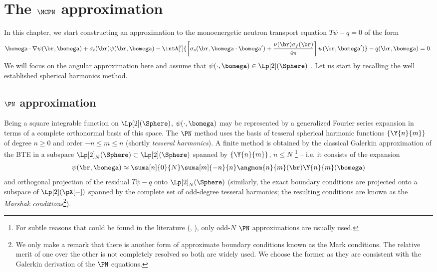 \chapter{The $\MCPN$ approximation}\label{sec:spn}

In this chapter, we start constructing an approximation to the monoenergetic neutron transport equation $T\psi - q = 0$
of the form
\begin{equation}\label{eq:MC-bte}
    \bomega\cdot\nabla\psi(\br,\bomega) + \sigma_t(\br)\psi(\br,\bomega) - \intA[']{\left[\sigma_s(\br,\bomega\cdot\bomega') + 
    \frac{\nu(\br)\sigma_f(\br)}{4\pi}\right]\psi(\br,\bomega')} - q(\br,\bomega) = 0.
\end{equation}
We will focus on the angular approximation here and assume that $\psi(\cdot,\bomega)\in\Lp[2](\Sphere)$
. 
Let us start by recalling the well established spherical harmonics method.

\section{$\PN$ approximation}\label{sec:SPH}
Being a square integrable function on $\Lp[2](\Sphere)$, $\psi(\cdot,\bomega)$ may be represented by a generalized
Fourier series expansion in terms of a complete orthonormal basis of this space. The $\PN$ method uses the basis of
tesseral spherical harmonic functions $\{\Y{n}{m}\}$ of degree $n\geq 0$ and order $-n \leq m \leq n$ (shortly
\textit{tesseral harmonics}). A finite method is obtained by the classical Galerkin approximation of the BTE in a
subspace $\Lp[2]_N(\Sphere)\subset\Lp[2](\Sphere)$ spanned by $\{\Y{n}{m}\}$,  $n \leq N$ \footnote{For subtle reasons
that could be found in the literature (\cite[Sec. 10.3.2]{Davison}, \cite[Sec. 9.6]{Stacey1}), only odd-$N$ $\PN$
approximations are usually used.} -- i.e. it consists of the expansion
\begin{equation}\label{eq:exp}
  \psi(\br,\bomega) \approx \suma[n]{0}{N}\suma[m]{-n}{n}\angmom{n}{m}(\br)\Y{n}{m}(\bomega)
\end{equation}
and orthogonal projection of the residual $T\psi - q$ onto $\Lp[2]_N(\Sphere)$ (similarly, the exact boundary conditions 
are projected onto a subspace of $\Lp[2](\pX[-])$ spanned by the complete set of odd-degree tesseral harmonics; 
the resulting conditions are known as the \textit{Marshak conditions}\footnote{We only make a remark that there is 
another form of approximate boundary conditions known as the Mark conditions. The relative merit of one over the other 
is not completely resolved so both are widely used. We choose the former as they are consistent with the Galerkin 
derivation of the $\PN$ equations.}).

